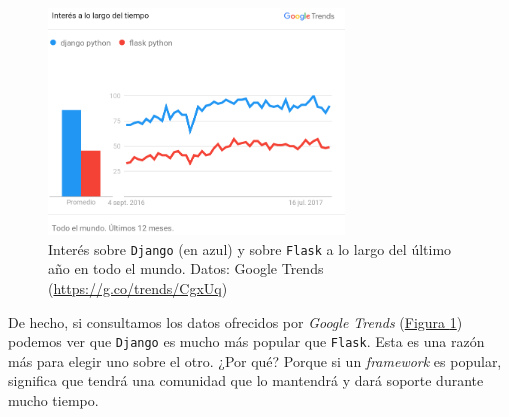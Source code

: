 \begin{figure}
\centering
\includegraphics[width=0.7\textwidth]{img/django_flask_trends}
\caption{Interés sobre \texttt{Django} (en azul) y sobre \texttt{Flask} a lo largo del último año en todo el mundo. Datos: Google Trends (\url{https://g.co/trends/CgxUq})}
\label{djangoflasktrends}
\end{figure}

De hecho, si consultamos los datos ofrecidos por \textit{Google Trends} (\hyperref[djangoflasktrends]{Figura \ref*{djangoflasktrends}}) podemos ver que \texttt{Django} es mucho más popular que \texttt{Flask}. Esta es una razón más para elegir uno sobre el otro. ¿Por qué? Porque si un \textit{framework} es popular, significa que tendrá una comunidad que lo mantendrá y dará soporte durante mucho tiempo. 
